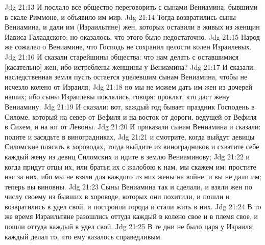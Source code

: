 Jdg 21:13  И послало все общество переговорить с сынами Вениамина, бывшими в скале Риммоне, и объявило им мир.
Jdg 21:14  Тогда возвратились сыны Вениамина, и дали им (Израильтяне) жен, которых оставили в живых из женщин Иависа Галаадского; но оказалось, что этого было недостаточно.
Jdg 21:15  Народ же сожалел о Вениамине, что Господь не сохранил целости колен Израилевых.
Jdg 21:16  И сказали старейшины общества: что нам делать с оставшимися [касательно] жен, ибо истреблены женщины у Вениамина?
Jdg 21:17  И сказали: наследственная земля пусть остается уцелевшим сынам Вениамина, чтобы не исчезло колено от Израиля;
Jdg 21:18  но мы не можем дать им жен из дочерей наших; ибо сыны Израилевы поклялись, говоря: проклят, кто даст жену Вениамину.
Jdg 21:19  И сказали: вот, каждый год бывает праздник Господень в Силоме, который на север от Вефиля и на восток от дороги, ведущей от Вефиля в Сихем, и на юг от Левоны.
Jdg 21:20  И приказали сынам Вениамина и сказали: подите и засядьте в виноградниках,
Jdg 21:21  и смотрите, когда выйдут девицы Силомские плясать в хороводах, тогда выйдите из виноградников и схватите себе каждый жену из девиц Силомских и идите в землю Вениаминову;
Jdg 21:22  и когда придут отцы их, или братья их с жалобою к нам, мы скажем им: простите нас за них, ибо мы не взяли для каждого из них жены на войне, и вы не дали им; теперь вы виновны.
Jdg 21:23  Сыны Вениамина так и сделали, и взяли жен по числу своему из бывших в хороводе, которых они похитили, и пошли и возвратились в удел свой, и построили города и стали жить в них.
Jdg 21:24  В то же время Израильтяне разошлись оттуда каждый в колено свое и в племя свое, и пошли оттуда каждый в удел свой.
Jdg 21:25  В те дни не было царя у Израиля; каждый делал то, что ему казалось справедливым.


